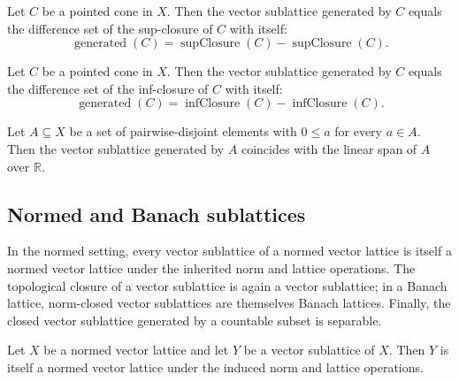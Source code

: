 \begin{theorem}
\label{thm:vectorSublattice-generated-pointedCone-eq-sub-supClosure}
\leanok
{}
Let $C$ be a pointed cone in $X$. Then the vector sublattice generated
by $C$ equals the difference set of the sup-closure of $C$ with
itself:
\[
  \operatorname{generated}(C) = \operatorname{supClosure}(C)
  - \operatorname{supClosure}(C).
\]
\end{theorem}

\begin{theorem}
\label{thm:vectorSublattice-generated-pointedCone-eq-sub-infClosure}
\leanok
{}
Let $C$ be a pointed cone in $X$. Then the vector sublattice generated
by $C$ equals the difference set of the inf-closure of $C$ with
itself:
\[
  \operatorname{generated}(C) = \operatorname{infClosure}(C)
  - \operatorname{infClosure}(C).
\]
\end{theorem}

\begin{theorem}
\label{thm:vectorSublattice-generated-eq-span-of-pairwise-vlDisjoint}
\leanok
{}
Let $A \subseteq X$ be a set of pairwise-disjoint elements with
$0 \le a$ for every $a \in A$. Then the vector sublattice generated by
$A$ coincides with the linear span of $A$ over $\mathbb{R}$.
\end{theorem}

\subsection{Normed and Banach sublattices}

In the normed setting, every vector sublattice of a normed vector
lattice is itself a normed vector lattice under the inherited norm and
lattice operations. The topological closure of a vector sublattice is
again a vector sublattice; in a Banach lattice, norm-closed vector
sublattices are themselves Banach lattices. Finally, the closed
vector sublattice generated by a countable subset is separable.

\begin{lemma}
\label{lem:vectorSublattice-instNormedVectorLatticeSubtype}
\leanok
{}
Let $X$ be a normed vector lattice and let $Y$ be a vector sublattice of
$X$. Then $Y$ is itself a normed vector lattice under the induced norm
and lattice operations.
\end{lemma}

